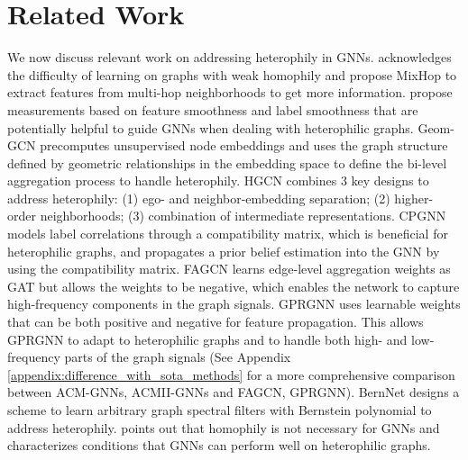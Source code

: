 \documentclass{article}
\newcommand{\0}{{\boldsymbol{0}}}
\newcommand{\6}{{\partial}}
\newcommand{\8}{{\infty}}
\newcommand{\4}{{\nabla}}
\begin{document}
\section{Related Work}
\vspace{-0.3cm}
\label{sec:related_works}
We now discuss relevant work on addressing heterophily in GNNs. \cite{abu2019mixhop} acknowledges the difficulty of learning on graphs with weak homophily and propose MixHop to extract features from multi-hop neighborhoods to get more information.  \cite{hou2019measuring} propose measurements based on feature smoothness and label smoothness that are potentially helpful to guide GNNs when dealing with heterophilic graphs. Geom-GCN \cite{pei2020geom} precomputes unsupervised node embeddings and uses the graph structure defined by geometric relationships in the embedding space to define the bi-level aggregation process to handle heterophily.  HGCN \cite{zhu2020beyond} combines 3 key designs to address heterophily: (1) ego- and neighbor-embedding separation; (2) higher-order neighborhoods; (3) combination of intermediate representations. CPGNN \cite{zhu2020graph} models label correlations through a compatibility matrix, which is beneficial for heterophilic graphs, and propagates a prior belief estimation into the GNN by using the compatibility matrix.  FAGCN \cite{bo2021beyond} learns edge-level aggregation weights as GAT \cite{velivckovic2017attention} but allows the weights to be negative, which enables the network to capture high-frequency components in the graph signals. GPRGNN \cite{chien2021adaptive} uses learnable weights that can be both positive and negative for feature propagation. This allows GPRGNN to adapt to heterophilic  graphs and  to handle both high- and low-frequency parts of the graph signals (See Appendix \ref{appendix:difference_with_sota_methods} for a more comprehensive comparison between ACM-GNNs, ACMII-GNNs and FAGCN, GPRGNN). BernNet \cite{he2021bernnet} designs a scheme to learn arbitrary graph spectral filters with Bernstein polynomial to address heterophily. \cite{ma2021homophily} points out that homophily is not necessary for GNNs and characterizes conditions that GNNs can perform well on heterophilic graphs.



\vspace{-0.1cm}
\end{document}
